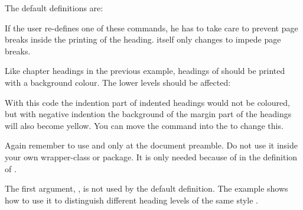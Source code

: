 The default definitions are:
\begin{lstcode}
\newcommand{\sectionlinesformat}[4]{%
  \@hangfrom{\hskip #2#3}{#4}%
}
\newcommand{\sectioncatchphraseformat}[4]{%
  \hskip #2#3#4%
}
\end{lstcode}

If the user re-defines one of these commands, he has to take care to prevent
page breaks inside the printing of the heading. \KOMAScript{} itself only
changes  to impede page breaks.

\begin{Example}
  Like chapter headings in the previous example, headings of 
   should be printed with a background colour. The lower
  levels should be affected:
\begin{lstcode}
  \makeatletter
  \renewcommand{\sectionlinesformat}[4]{%
    \@tempswafalse
    \ifstr{#1}{section}{%
      \hspace*{#2}%
      \colorbox{yellow}{%
        \parbox{\dimexpr\linewidth-2\fboxrule-2\fboxsep-#2}{%
          \raggedsection
          \@hangfrom{#3}{#4}%
        }%
      }%
    }{%
      \@hangfrom{\hskip #2#3}{#4}%
    }%
  }
  \makeatother
\end{lstcode}
  With this code the indention part of indented headings would not be
  coloured, but with negative indention the background of the margin part of
  the headings will also become yellow. You can move the 
  command into the  to change this.

  Again remember to use  and  only at the
  document preamble. Do not use it inside your own wrapper-class or
  package. It is only needed because of  in the definition of
  .
\end{Example}

The first argument, , is not used by the default definition. The
example shows how to use it to distinguish different heading levels of the
same style .%
\EndIndexGroup


